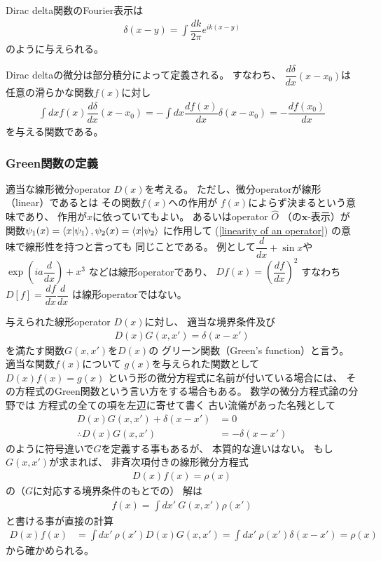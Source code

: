 Dirac delta関数のFourier表示は
\begin{align}
    \delta(x-y)
    =
    \int
    \dfrac{dk}{2\pi}
    e^{ik(x-y)}
\label{dirac delta fourier representation}
\end{align}
のように与えられる。

Dirac deltaの微分は部分積分によって定義される。
すなわち、
$\dfrac{d \delta}{dx}
    (x - x_0)$は
任意の滑らかな関数$f(x)$に対し
\begin{align}
    \int dx
    f(x)
    \dfrac{d \delta}{dx}
    (x - x_0)
=
    -
    \int dx
    \dfrac{d f(x)}{dx}
    \delta(x - x_0)
=
    -
    \dfrac{d f(x_0)}{dx}
\label{derivative of delta function}
\end{align}
を与える関数である。

\subsubsection{Green関数の定義}

適当な線形微分operator $D(x)$を考える。
ただし、微分operatorが線形（linear）であるとは
その関数$f(x)$への作用が
$f(x)$によらず決まるという意味であり、
作用が$x$に依っていてもよい。
あるいはoperator $\hat{O}$
（の$\bm{x}$-表示）が
関数$\psi_1(x) = \braket{x | \psi_1},
\psi_2(x) = \braket{x | \psi_2}$
に作用して
(\ref{linearity of an operator})
の意味で線形性を持つと言っても
同じことである。
例として$\dfrac{d}{dx} + \sin x$や
$\exp( i a \dfrac{d}{dx}) + x^3$
などは線形operatorであり、
$D f(x) = \left(
    \dfrac{d f}{dx}
\right)^2$
すなわち$D[f] = \dfrac{d f}{dx}
    \dfrac{d}{dx}$
は線形operatorではない。

与えられた線形operator $D(x)$に対し、
適当な境界条件及び
\begin{align}
    D(x) G(x, x')
    =
    \delta(x - x')
\end{align}
を満たす関数$G(x, x')$を$D(x)$の
グリーン関数（Green's function）と言う。
適当な関数$f(x)$について
$g(x)$を与えられた関数として
$D(x) f(x) = g(x)$
という形の微分方程式に名前が付いている場合には、
その方程式のGreen関数という言い方をする場合もある。
数学の微分方程式論の分野では
方程式の全ての項を左辺に寄せて書く
古い流儀があった名残として
\begin{align*}
    D(x) G(x, x')
    +
    \delta(x - x')
&=
    0
\\\therefore
    D(x) G(x, x')
&=
    -
    \delta(x - x')
\end{align*}
のように符号違いで$G$を定義する事もあるが、
本質的な違いはない。
もし$G(x, x')$が求まれば、
非斉次項付きの線形微分方程式
\begin{align}
    D(x) f(x)
    =
    \rho(x)
\end{align}
の（$G$に対応する境界条件のもとでの）
解は
\begin{align}
    f(x) =
    \int dx'\ 
        G(x, x')
        \rho(x')
\label{convolution representation of green function solution}
\end{align}
と書ける事が直接の計算
\begin{align}
    D(x) f(x)
&=
    \int dx'\ 
        \rho(x')
    D(x)
        G(x, x')
=
    \int dx'\ 
        \rho(x')
    \delta (x - x')
=
    \rho(x)
\end{align}
から確かめられる。

